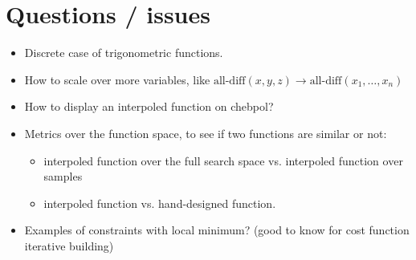 \documentclass[a4paper, 12pt]{article}
\begin{document}
\section{Questions / issues}
\begin{itemize}
\item Discrete case of trigonometric functions.
\item How to scale over more variables, like $\text{all-diff}(x, y, z)
  \rightarrow \text{all-diff}(x_1, \ldots, x_n)$
\item How to display an interpoled function on chebpol?
\item Metrics  over the function  space, to  see if two  functions are
  similar or not:
  \begin{itemize}
  \item interpoled function over the  full search space vs. interpoled
    function over samples
  \item interpoled function vs. hand-designed function.
  \end{itemize}
\item Examples of constraints with local minimum? (good to know for cost function iterative building)
\end{itemize}




\end{document}
